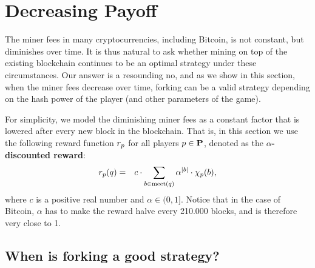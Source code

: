 
\section{Decreasing Payoff}
\label{sec-dec}


The miner fees in many cryptocurrencies, including Bitcoin, is not constant, but diminishes over time. 
It is thus natural to ask whether mining on top of the existing blockchain continues to be an optimal strategy under these 
circumstances. Our answer is a resounding no, and as we show in this section, when the miner fees decrease over time, forking can be a valid strategy depending on the hash power of the player (and other parameters of the game). 

For simplicity, we model the diminishing miner fees as a constant factor that is lowered after every new block in the blockchain. That is, in this section 
we use the following reward function $r_p$ for all players $p \in \mathbf{P}$, denoted as the \textbf{$\alpha$-discounted reward}: 
\begin{eqnarray*}
r_p(q) & = & 
c \cdot \sum_{b \in \text{\rm meet}(q)} \alpha^{|b|} \cdot \chi_p(b),
\end{eqnarray*}
where $c$ is a positive real number and $\alpha \in (0,1]$. Notice that in the case of Bitcoin, $\alpha$ has to make the reward halve every 210.000 blocks, and is therefore very close to 1. %

%

\subsection{When is forking a good strategy?}
\label{sec-forkingstrategies}

